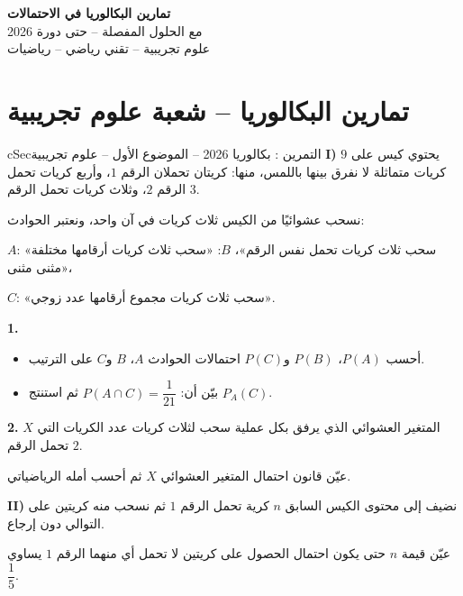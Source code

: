 \documentclass[12pt,a4paper]{article}
\newenvironment{BOX}[2]{\begin{otherlanguage}{english}\begin{arbox}{#1}{#2}}{\end{arbox}\end{otherlanguage}}
\newcounter{exo}
\newenvironment{tamrin}[1]{\stepcounter{exo}\begin{BOX}{cSec}{التمرين \theexo: #1}}{\end{BOX}}
\newenvironment{LTR}{\begin{otherlanguage}{english}}{\end{otherlanguage}}
\newenvironment{sq}{\begin{itemize}[leftmargin=2.4em,itemsep=3pt]}{\end{itemize}}
\newcommand{\qa}{\item[(أ)]}\newcommand{\qb}{\item[(ب)]}\newcommand{\qc}{\item[(جـ)]}\newcommand{\qd}{\item[(د)]}\newcommand{\qe}{\item[(هـ)]}
\newcommand{\QQ}[1]{\par\smallskip\textbf{#1.} }
\begin{document}
\begin{LTR}
\begin{tcolorbox}[enhanced,colback=cSec,colframe=cSec,arc=3mm,halign=center,boxrule=0pt,top=12pt,bottom=12pt,before upper={\selectlanguage{arabic}}]
{\color{white}\fontsize{26}{32}\selectfont\bfseries تمارين البكالوريا في الاحتمالات}\\[8pt]
{\color{white}\large مع الحلول المفصلة -- حتى دورة 2026}\\[5pt]
{\color{white}\large علوم تجريبية -- تقني رياضي -- رياضيات}
\end{tcolorbox}
\end{LTR}
\section{تمارين البكالوريا -- شعبة علوم تجريبية}

\begin{tamrin}{بكالوريا 2026 -- الموضوع الأول -- علوم تجريبية}
\textbf{I)} يحتوي كيس على $9$ كريات متماثلة لا نفرق بينها باللمس، منها: كريتان تحملان الرقم $1$، وأربع كريات تحمل الرقم $2$، وثلاث كريات تحمل الرقم $3$.

نسحب عشوائيًا من الكيس ثلاث كريات في آن واحد، ونعتبر الحوادث:

$A$: «سحب ثلاث كريات تحمل نفس الرقم»، \quad $B$: «سحب ثلاث كريات أرقامها مختلفة مثنى مثنى»،

$C$: «سحب ثلاث كريات مجموع أرقامها عدد زوجي».

\QQ{1}
\begin{sq}
\qa أحسب $P(A)$، $P(B)$ و$P(C)$ احتمالات الحوادث $A$، $B$ و$C$ على الترتيب.
\qb بيّن أن: $P(A\cap C)=\dfrac{1}{21}$ ثم استنتج $P_A(C)$.
\end{sq}
\QQ{2} $X$ المتغير العشوائي الذي يرفق بكل عملية سحب لثلاث كريات عدد الكريات التي تحمل الرقم $2$.

عيّن قانون احتمال المتغير العشوائي $X$ ثم أحسب أمله الرياضياتي.

\textbf{II)} نضيف إلى محتوى الكيس السابق $n$ كرية تحمل الرقم $1$ ثم نسحب منه كريتين على التوالي دون إرجاع.

عيّن قيمة $n$ حتى يكون احتمال الحصول على كريتين لا تحمل أي منهما الرقم $1$ يساوي $\dfrac{1}{5}$.
\end{tamrin}
\end{document}
